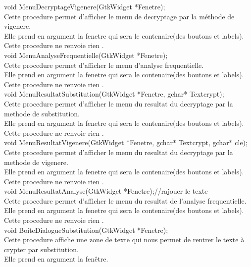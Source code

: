 \documentclass[a4]{article}
\begin{document}
	void MenuDecryptageVigenere(GtkWidget *Fenetre);\\
		Cette procedure permet d'afficher le menu de decryptage par la méthode de vigenere.\\
		Elle prend en argument la fenetre qui sera le contenaire(des boutons et labels).\\
		Cette procedure ne renvoie rien .\\
	
	void MenuAnalyseFrequentielle(GtkWidget *Fenetre);\\
		Cette procedure permet d'afficher le menu d'analyse frequentielle.\\
		Elle prend en argument la fenetre qui sera le contenaire(des boutons et labels).\\
		Cette procedure ne renvoie rien .\\
	
	void MenuResultatSubstitution(GtkWidget *Fenetre, gchar* Textcrypt);\\
		Cette procedure permet d'afficher le menu du resultat du decryptage par la methode de substitution.\\
		Elle prend en argument la fenetre qui sera le contenaire(des boutons et labels).\\
		Cette procedure ne renvoie rien .\\
	
	void MenuResultatVigenere(GtkWidget *Fenetre, gchar* Textcrypt, gchar* cle);\\
		Cette procedure permet d'afficher le menu du resultat du decryptage par la methode de vigenere.\\
		Elle prend en argument la fenetre qui sera le contenaire(des boutons et labels).\\
		Cette procedure ne renvoie rien .\\
	
	void MenuResultatAnalyse(GtkWidget *Fenetre);//rajouer le texte\\
		Cette procedure permet d'afficher le menu du resultat de l'analyse frequentielle.\\
		Elle prend en argument la fenetre qui sera le contenaire(des boutons et labels).\\
		Cette procedure ne renvoie rien .\\
	
	void BoiteDialogueSubstitution(GtkWidget *Fenetre);\\
		Cette procedure affiche une zone de texte qui nous permet de rentrer le texte à crypter par substitution.\\
		Elle prend en argument la fenêtre.\\
	
\end{document}
